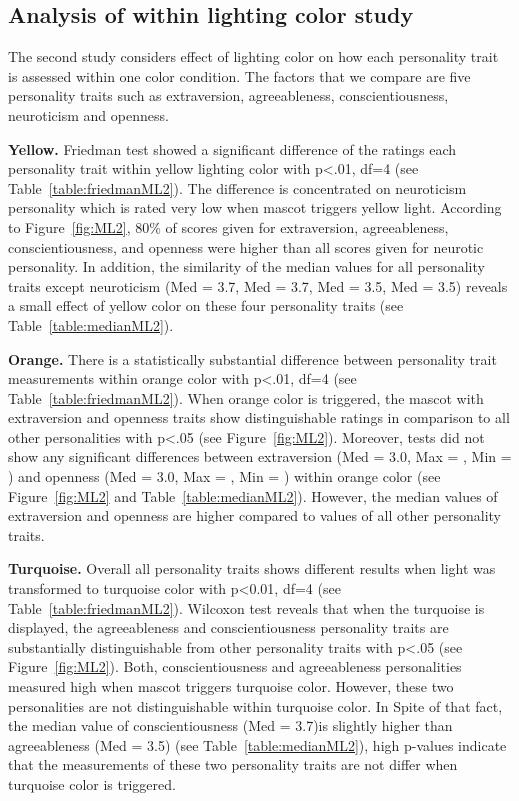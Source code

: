 \subsection{Analysis of within lighting color study}
\label{subsec:MLstudy2}
The second study considers effect of lighting color on how each
personality trait is assessed within one color condition.
The factors that we compare are five personality traits such as extraversion, agreeableness, conscientiousness,
neuroticism and openness.

\par\textbf{Yellow.}
Friedman test showed a significant difference of the ratings each personality trait
within yellow lighting color with p<.01, df=4 (see Table~\ref{table:friedmanML2}).
The difference is concentrated on neuroticism personality which is rated very low when mascot triggers yellow light.
According to Figure~\ref{fig:ML2}, 80\% of scores given for extraversion, agreeableness,
conscientiousness, and openness were higher than all scores given for neurotic personality.
In addition, the similarity of the median values for all personality traits except
neuroticism (Med = 3.7, Med = 3.7, Med = 3.5, Med = 3.5) reveals a small effect of yellow
color on these four personality traits (see Table~\ref{table:medianML2}).

\par\textbf{Orange.}
There is a statistically substantial difference between personality trait measurements within
orange color with p<.01, df=4 (see Table~\ref{table:friedmanML2}).
When orange color is triggered, the mascot with extraversion and openness traits
show distinguishable ratings in comparison to all other personalities with p<.05 (see Figure~\ref{fig:ML2}).
Moreover, tests did not show any significant differences between extraversion (Med = 3.0, Max = , Min = )
and openness (Med = 3.0, Max = , Min = ) within orange color (see Figure~\ref{fig:ML2} and Table~\ref{table:medianML2}).
However, the median values of extraversion and openness are higher compared to values of all other personality traits.

\par\textbf{Turquoise.}
Overall all personality traits shows different results when light was transformed to turquoise color
with p<0.01, df=4 (see Table~\ref{table:friedmanML2}).
Wilcoxon test reveals that when the turquoise is displayed, the agreeableness and conscientiousness
personality traits are substantially distinguishable from other personality traits with p<.05 (see Figure~\ref{fig:ML2}).
Both, conscientiousness and agreeableness personalities measured high when mascot triggers turquoise color.
However, these two personalities are not distinguishable within turquoise color.
In Spite of that fact, the median value of conscientiousness (Med = 3.7)is slightly higher than
agreeableness (Med = 3.5) (see Table~\ref{table:medianML2}), high p-values indicate that the measurements of
these two personality traits are not differ when turquoise color is triggered.

